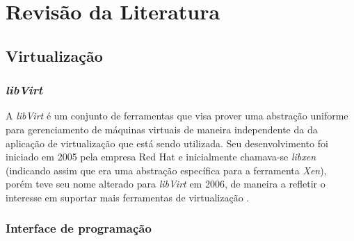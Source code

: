 %
%

\chapter{Revisão da Literatura}



\section{Virtualização}

% 

\subsection{\emph{libVirt}}\label{sec:libvirt}


A \emph{libVirt} é um conjunto de ferramentas que visa prover uma abstração
uniforme para gerenciamento de máquinas virtuais de maneira independente da
da aplicação de virtualização que está sendo utilizada. Seu desenvolvimento
foi iniciado em 2005 pela empresa Red Hat e inicialmente chamava-se
\emph{libxen} (indicando assim que era uma abstração específica para a
ferramenta \emph{Xen}), porém teve seu nome alterado para \emph{libVirt} em
2006, de maneira a refletir o interesse em suportar mais ferramentas de
virtualização .

\subsection{Interface de programação}


